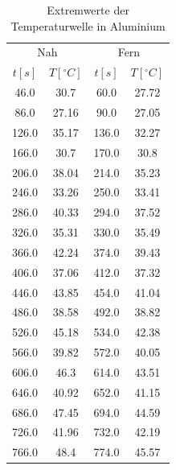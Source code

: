 \documentclass[11pt]{article}
\begin{document}
\begin{table}[P]
\centering
\label{alu_extr}
\begin{tabular}{c|c||c|c}
\multicolumn{2}{c||}{Nah} & \multicolumn{2}{c}{Fern}\\
$t[s]$ & $T[^\circ C]$ & $t[s]$ & $T[^\circ C]$ \\
\hline
46.0 & 30.7 & 60.0 & 27.72\\
86.0 & 27.16 & 90.0 & 27.05\\
126.0 & 35.17 & 136.0 & 32.27\\
166.0 & 30.7 & 170.0 & 30.8\\
206.0 & 38.04 & 214.0 & 35.23\\
246.0 & 33.26 & 250.0 & 33.41\\
286.0 & 40.33 & 294.0 & 37.52\\
326.0 & 35.31 & 330.0 & 35.49\\
366.0 & 42.24 & 374.0 & 39.43\\
406.0 & 37.06 & 412.0 & 37.32\\
446.0 & 43.85 & 454.0 & 41.04\\
486.0 & 38.58 & 492.0 & 38.82\\
526.0 & 45.18 & 534.0 & 42.38\\
566.0 & 39.82 & 572.0 & 40.05\\
606.0 & 46.3 & 614.0 & 43.51\\
646.0 & 40.92 & 652.0 & 41.15\\
686.0 & 47.45 & 694.0 & 44.59\\
726.0 & 41.96 & 732.0 & 42.19\\
766.0 & 48.4 & 774.0 & 45.57\\

\end{tabular}
\caption{Extremwerte der Temperaturwelle in Aluminium}
\end{table}
\end{document}
